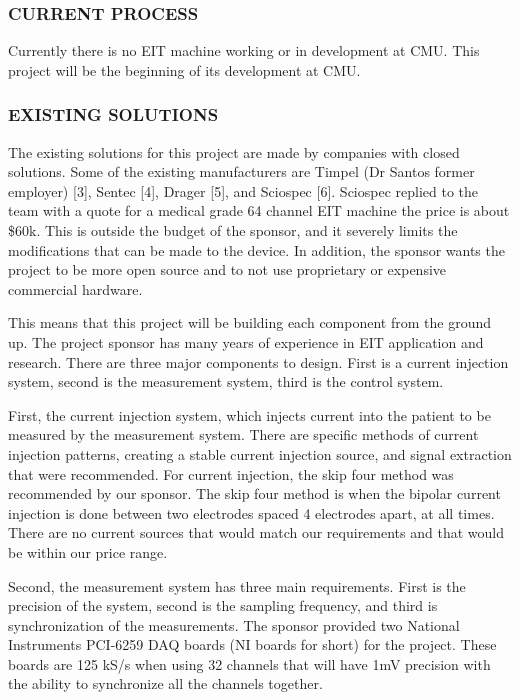 \documentclass[12pt]{article}
\begin{document}
\subsubsection{CURRENT PROCESS}\label{current-process}

Currently there is no EIT machine working or in development at CMU. This
project will be the beginning of its development at CMU.

\subsubsection{EXISTING SOLUTIONS}\label{existing-solutions}

The existing solutions for this project are made by companies with
closed solutions. Some of the existing manufacturers are Timpel (Dr
Santos\textquotesingle{} former employer) {[}3{]}, Sentec {[}4{]},
Drager {[}5{]}, and Sciospec {[}6{]}. Sciospec replied to the team with a
quote for a medical grade 64 channel EIT machine the price is about
\$60k. This is outside the budget of the sponsor, and it severely limits
the modifications that can be made to the device. In addition, the
sponsor wants the project to be more open source and to not use
proprietary or expensive commercial hardware.

This means that this project will be building each component from the
ground up. The project sponsor has many years of experience in EIT
application and research. There are three major components to design.
First is a current injection system, second is the measurement system,
third is the control system.

First, the current injection system, which injects current into the
patient to be measured by the measurement system. There are specific
methods of current injection patterns, creating a stable current
injection source, and signal extraction that were recommended. For
current injection, the skip four method was recommended by our sponsor.
The skip four method is when the bipolar current injection is done
between two electrodes spaced 4 electrodes apart, at all times. There
are no current sources that would match our requirements and that would
be within our price range.

Second, the measurement system has three main requirements. First is the
precision of the system, second is the sampling frequency, and third is
synchronization of the measurements. The sponsor provided two National
Instruments PCI-6259 DAQ boards (NI boards for short) for the project.
These boards are 125 kS/s when using 32 channels that will have 1mV
precision with the ability to synchronize all the channels together.
\end{document}
